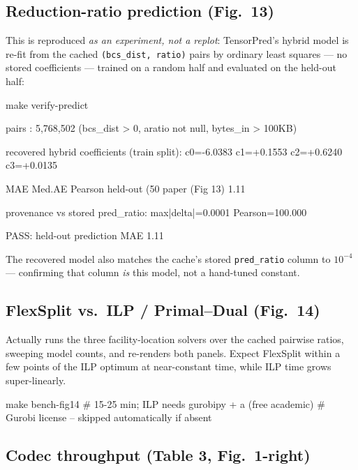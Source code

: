 \documentclass[11pt]{article}
\newcommand{\code}[1]{\texttt{#1}}
\begin{document}
\subsection{Reduction-ratio prediction (Fig.~13)}

This is reproduced \emph{as an experiment, not a replot}: TensorPred's hybrid
model is re-fit from the cached \code{(bcs\_dist, ratio)} pairs by ordinary
least squares --- no stored coefficients --- trained on a random half and
evaluated on the held-out half:

\begin{shell}
make verify-predict
\end{shell}
\begin{term}
  pairs   : 5,768,502  (bcs_dist > 0, aratio not null, bytes_in > 100KB)

  recovered hybrid coefficients (train split):
    c0=-6.0383  c1=+0.1553  c2=+0.6240  c3=+0.0135

                               MAE    Med.AE     Pearson
  held-out (50%
  paper (Fig 13)             1.11%

  provenance vs stored pred_ratio: max|delta|=0.0001  Pearson=100.000%

  PASS: held-out prediction MAE 1.11%
\end{term}

The recovered model also matches the cache's stored \code{pred\_ratio}
column to $10^{-4}$ --- confirming that column \emph{is} this model, not a
hand-tuned constant.

\subsection{FlexSplit vs.\ ILP / Primal--Dual (Fig.~14)}

Actually runs the three facility-location solvers over the cached pairwise
ratios, sweeping model counts, and re-renders both panels. Expect FlexSplit
within a few points of the ILP optimum at near-constant time, while ILP time
grows super-linearly.

\begin{shell}
make bench-fig14    # 15-25 min; ILP needs gurobipy + a (free academic)
                    # Gurobi license -- skipped automatically if absent
\end{shell}

\subsection{Codec throughput (Table 3, Fig.~1-right)}
\end{document}
